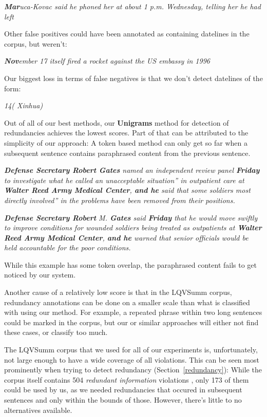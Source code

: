 \documentclass[a4paper,10pt]{scrartcl}
\theoremstyle{style}
\begin{document}
\quad\textit{\textbf{Mar}uca-Kovac said he phoned her at about 1 p.m. Wednesday, telling her he had left}

Other false positives could have been annotated as containing datelines in the corpus, but weren't:

\quad\textit{\textbf{Nov}ember 17 itself fired a rocket against the US embassy in 1996}

Our biggest loss in terms of false negatives is that we don't detect datelines of the form:

\quad\textit{14( Xinhua)}

Out of all of our best methods, our \textbf{Unigrams} method for detection of redundancies achieves the lowest scores. Part of that can be attributed to the simplicity of our approach: A token based method can only get so far when a subsequent sentence contains paraphrased content from the previous sentence.

\quad\textit{\textbf{Defense Secretary Robert Gates} named an independent review panel \textbf{Friday} to investigate what he called an unacceptable situation'' in outpatient care at \textbf{Walter Reed Army Medical Center}, \textbf{and he} said that some soldiers most directly involved'' in the problems have been removed from their positions.}

\quad\textit{\textbf{Defense Secretary Robert} M. \textbf{Gates} said \textbf{Friday} that he would move swiftly to improve conditions for wounded soldiers being treated as outpatients at \textbf{Walter Reed Army Medical Center}, \textbf{and he} warned that senior officials would be held accountable for the poor conditions.}

While this example has some token overlap, the paraphrased content fails to get noticed by our system.

Another cause of a relatively low score is that in the LQVSumm corpus, redundancy annotations can be done on a smaller scale than what is classified with using our method. For example, a repeated phrase within two long sentences could be marked in the corpus, but our or similar approaches will either not find these cases, or classify too much.

The LQVSumm corpus that we used for all of our experiments is, unfortunately, not large enough to have a wide coverage of all violations. This can be seen most prominently when trying to detect redundancy (Section~\ref{redundancy}): While the corpus itself contains 504 \textit{redundant information} violations \citep[see][]{friedrichlqvsumm}, only 173 of them could be used by us, as we needed redundancies that occured in subsequent sentences and only within the bounds of those.
However, there's little to no alternatives available.
\end{document}
